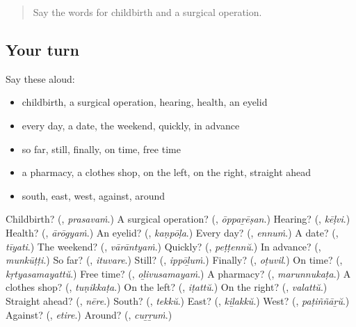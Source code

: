 \label{lesson:ML-R198-second-pass-words-from-chapters-194-198}



\begin{quote}
Say the words for childbirth and a surgical operation.
\end{quote}

\subsection*{Your turn}
Say these aloud:

\begin{itemize}
\raggedright
  \item childbirth, a surgical operation, hearing, health, an eyelid
  \item every day, a date, the weekend, quickly, in advance
  \item so far, still, finally, on time, free time
  \item a pharmacy, a clothes shop, on the left, on the right, straight ahead
  \item south, east, west, against, around
\end{itemize}

\begin{tcolorbox}[breakable,colback=teal!4,colframe=teal!35!black,title={Before you move on}]
Childbirth? (\textbf{}, \emph{prasavaṁ}.) A surgical operation? (\textbf{}, \emph{ōppaṟēṣan}.) Hearing? (\textbf{}, \emph{kēḷvi}.) Health? (\textbf{}, \emph{ārōgyaṁ}.) An eyelid? (\textbf{}, \emph{kaṇpōḷa}.) Every day? (\textbf{}, \emph{ennuṁ}.) A date? (\textbf{}, \emph{tīyati}.) The weekend? (\textbf{}, \emph{vārāntyaṁ}.) Quickly? (\textbf{}, \emph{peṭṭennŭ}.) In advance? (\textbf{}, \emph{munkūṭṭi}.) So far? (\textbf{}, \emph{ituvare}.) Still? (\textbf{}, \emph{ippōḻuṁ}.) Finally? (\textbf{}, \emph{oṭuvil}.) On time? (\textbf{}, \emph{kṛtyasamayattŭ}.) Free time? (\textbf{}, \emph{oḻivusamayaṁ}.) A pharmacy? (\textbf{}, \emph{marunnukaṭa}.) A clothes shop? (\textbf{}, \emph{tuṇikkaṭa}.) On the left? (\textbf{}, \emph{iṭattŭ}.) On the right? (\textbf{}, \emph{valattŭ}.) Straight ahead? (\textbf{}, \emph{nēre}.) South? (\textbf{}, \emph{tekkŭ}.) East? (\textbf{}, \emph{kiḻakkŭ}.) West? (\textbf{}, \emph{paṭiññāṟŭ}.) Against? (\textbf{}, \emph{etire}.) Around? (\textbf{}, \emph{cuṟṟuṁ}.)
\end{tcolorbox}

